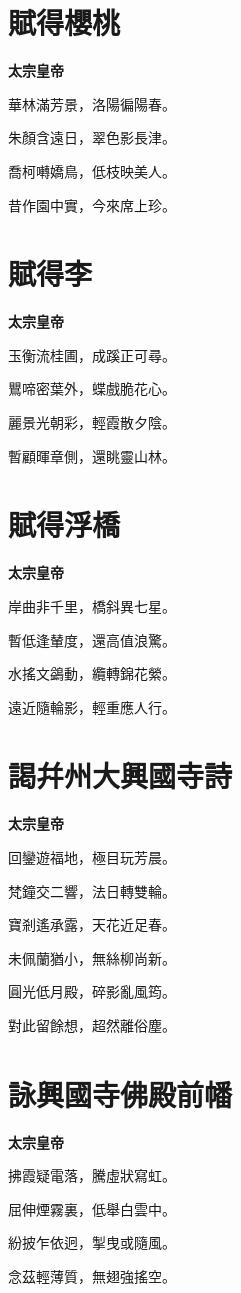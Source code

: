 \documentclass[12pt,a4paper]{ctexbook}
\begin{document}
\section{賦得櫻桃}
\textbf{太宗皇帝}\par\vspace{0.5em}
華林滿芳景，洛陽徧陽春。\par
朱顏含遠日，翠色影長津。\par
喬柯囀嬌鳥，低枝映美人。\par
昔作園中實，今來席上珍。\par

\section{賦得李}
\textbf{太宗皇帝}\par\vspace{0.5em}
玉衡流桂圃，成蹊正可尋。\par
鸎啼密葉外，蝶戲脆花心。\par
麗景光朝彩，輕霞散夕陰。\par
暫顧暉章側，還眺靈山林。\par

\section{賦得浮橋}
\textbf{太宗皇帝}\par\vspace{0.5em}
岸曲非千里，橋斜異七星。\par
暫低逢輦度，還高值浪驚。\par
水搖文鷁動，纜轉錦花縈。\par
遠近隨輪影，輕重應人行。\par

\section{謁幷州大興國寺詩}
\textbf{太宗皇帝}\par\vspace{0.5em}
回鑾遊福地，極目玩芳晨。\par
梵鐘交二響，法日轉雙輪。\par
寶剎遙承露，天花近足春。\par
未佩蘭猶小，無絲柳尚新。\par
圓光低月殿，碎影亂風筠。\par
對此留餘想，超然離俗塵。\par

\section{詠興國寺佛殿前幡}
\textbf{太宗皇帝}\par\vspace{0.5em}
拂霞疑電落，騰虛狀寫虹。\par
屈伸煙霧裏，低舉白雲中。\par
紛披乍依迥，掣曳或隨風。\par
念茲輕薄質，無翅強搖空。\par
\end{document}
